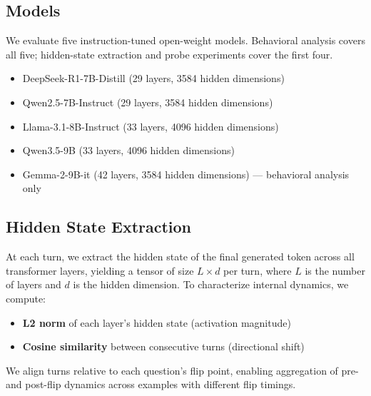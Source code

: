 \documentclass[11pt]{article}
\begin{document}

\subsection{Models}
\label{subsec:models}

  We evaluate five instruction-tuned open-weight models. Behavioral analysis covers all five;
  hidden-state extraction and probe experiments cover the first four.

  \begin{itemize}[noitemsep, topsep=2pt]
      \item DeepSeek-R1-7B-Distill (29 layers, 3584 hidden dimensions)
      \item Qwen2.5-7B-Instruct (29 layers, 3584 hidden dimensions)
      \item Llama-3.1-8B-Instruct (33 layers, 4096 hidden dimensions)
      \item Qwen3.5-9B (33 layers, 4096 hidden dimensions)
      \item Gemma-2-9B-it (42 layers, 3584 hidden dimensions) --- behavioral analysis only
  \end{itemize}

\subsection{Hidden State Extraction}
\label{subsec:hidden-state-extraction}

At each turn, we extract the hidden state of the final generated token across all transformer
layers, yielding a tensor of size $L \times d$ per turn, where $L$ is the number of layers and
$d$ is the hidden dimension. To characterize internal dynamics, we compute:

\begin{itemize}[noitemsep, topsep=2pt]
    \item \textbf{L2 norm} of each layer's hidden state (activation magnitude)
    \item \textbf{Cosine similarity} between consecutive turns (directional shift)
\end{itemize}

We align turns relative to each question's flip point, enabling aggregation of pre- and
post-flip dynamics across examples with different flip timings.
\end{document}
